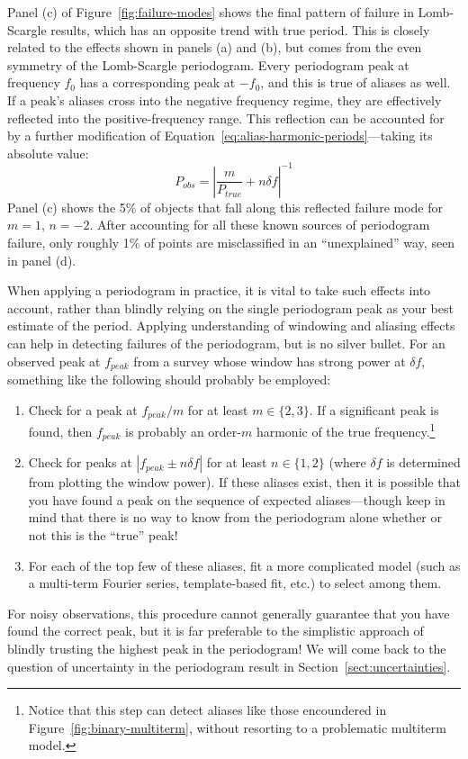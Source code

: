 \documentclass[preprint]{aastex}
\newcommand{\fig}[1]{Figure~\ref{fig:#1}}
\newcommand{\Eq}[1]{Equation~\ref{eq:#1}}
\newcommand{\eq}[1]{\Eq{#1}}
\newcommand{\eqlabel}[1]{\label{eq:#1}}
\newcommand{\Sect}[1]{Section~\ref{sect:#1}}
\newcommand{\sect}[1]{\Sect{#1}}
\begin{document}
Panel (c) of \fig{failure-modes} shows the final pattern of failure in
Lomb-Scargle results, which has an opposite trend with true period.
This is closely related to the effects shown in panels (a) and (b),
but comes from the even symmetry of the Lomb-Scargle periodogram.
Every periodogram peak at frequency $f_0$ has a corresponding peak at $-f_0$,
and this is true of aliases as well.
If a peak's aliases cross into the negative frequency regime, they are
effectively reflected into the positive-frequency range.
This reflection can be accounted for by a further modification of
\eq{alias-harmonic-periods}---taking its absolute value:
\begin{equation}
  P_{obs} = \left|\frac{m}{P_{true}} + n\delta f\right|^{-1}
  \eqlabel{failure-modes}
\end{equation}
Panel (c) shows the 5\% of objects that fall along this reflected
failure mode for $m=1$, $n=-2$.
After accounting for all these known sources of periodogram failure,
only roughly 1\% of points are misclassified in an ``unexplained'' way,
seen in panel (d).

When applying a periodogram in practice, it is vital to take such effects into
account, rather than blindly relying on the single periodogram peak as your
best estimate of the period.
Applying understanding of windowing and aliasing effects can help in detecting
failures of the periodogram, but is no silver bullet.
For an observed peak at $f_{peak}$ from a survey whose window has strong power
at $\delta f$, something like the following should probably be employed:
\begin{enumerate}
  \item Check for a peak at $f_{peak}/m$ for at least $m \in \{2, 3\}$.
    If a significant peak is found, then $f_{peak}$ is probably an order-$m$
    harmonic of the true frequency.\footnote{Notice that this step can detect
      aliases like those encoundered in \fig{binary-multiterm},
      without resorting to a problematic multiterm model.}
  \item Check for peaks at $|f_{peak} \pm n\delta f|$ for at least
    $n \in \{1, 2\}$ (where $\delta f$ is determined from plotting the window
    power). If these aliases exist, then it is possible that you have
    found a peak on the sequence of expected aliases---though keep in mind that
    there is no way to know from the periodogram alone whether or not
    this is the ``true'' peak!
  \item For each of the top few of these aliases, fit a more complicated model
    (such as a multi-term Fourier series, template-based fit, etc.) to select
    among them.
\end{enumerate}
For noisy observations, this procedure cannot generally guarantee that you
have found the correct peak, but it is far preferable to the simplistic
approach of blindly trusting the highest peak in the periodogram!
We will come back to the question of uncertainty in the periodogram result
in \sect{uncertainties}.
\end{document}
